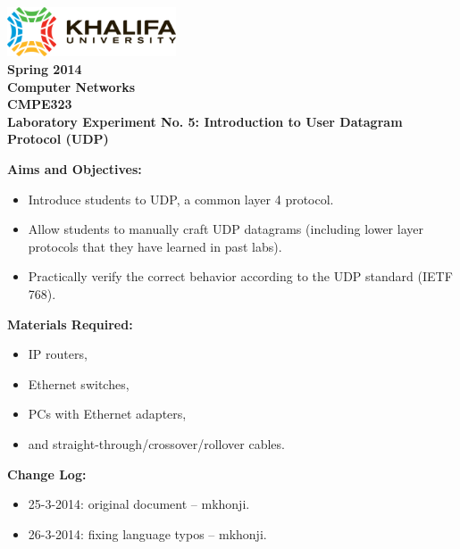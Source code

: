 \documentclass[pdftex,12pt,a4paper]{article}
\begin{document}
    \begin{titlepage}
        \begin{center}
            \includegraphics[width=5cm]{figures/kulogo}\\[1cm]
            {\Large \bfseries
                Spring 2014\\
                Computer Networks\\
                CMPE323\\[1cm]
            }
            {\large \bfseries
                \noindent Laboratory Experiment No. 5: Introduction to User
                Datagram Protocol (UDP)\\[1cm]
            }
        \end{center}

        \noindent \textbf{Aims and Objectives:}
            \begin{itemize}[leftmargin=4cm]
                \item Introduce students to UDP, a common layer 4 protocol.
                \item Allow students to manually craft UDP datagrams (including
                    lower layer protocols that they have learned in past labs).
                \item Practically verify the correct behavior according to the
                    UDP standard (IETF 768).
            \end{itemize}
            \vspace{0.5cm}

        \noindent \textbf{Materials Required:}
            \begin{itemize}[leftmargin=4cm]
                \item IP routers,
                \item Ethernet switches,
                \item PCs with Ethernet adapters,
                \item and straight-through/crossover/rollover cables.
            \end{itemize}
            \vspace{0.5cm}

        \noindent \textbf{Change Log:}
            \begin{itemize}[leftmargin=4cm]
                \item 25-3-2014: original document -- mkhonji.
                \item 26-3-2014: fixing language typos -- mkhonji.
            \end{itemize}
    \end{titlepage}
    \newpage
\end{document}
